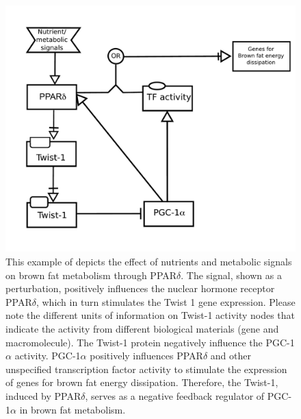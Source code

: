 \begin{figure}[H]
\centering
\vspace*{-0.75em}
\includegraphics[scale=0.4]{examples/PPAR}
\caption{This example of \AF depicts the effect of nutrients and metabolic signals on brown fat metabolism through PPAR$\delta$.  The signal, shown as a perturbation, positively influences the nuclear hormone receptor PPAR$\delta$, which in turn stimulates the Twist 1 gene expression.  Please note the different units of information on Twist-1 activity nodes that indicate the activity from different biological materials (gene and macromolecule).  The Twist-1 protein negatively influence the PGC-1$\alpha$ activity.  PGC-1$\alpha$ positively influences PPAR$\delta$ and other unspecified transcription factor activity to stimulate the expression of genes for brown fat energy dissipation.  Therefore, the Twist-1, induced by PPAR$\delta$, serves as a negative feedback regulator of PGC-1$\alpha$ in brown fat metabolism. }
\label{fig:af:1}
\end{figure}
